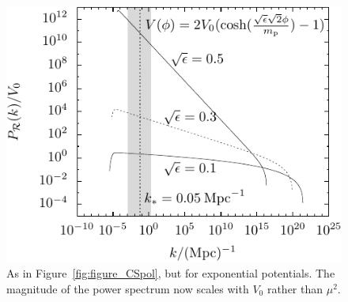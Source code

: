 %
\begin{figure}[ht]
  \includegraphics[width=\textwidth]{chapter_kinetic_dominance/figures/CSlam}
  \caption{As in Figure~\protect\ref{fig:figure_CSpol}, but for exponential potentials. The magnitude of the power spectrum now scales with $V_0$ rather than $\mu^2$.\label{fig:figure_CSlam}}
\end{figure}
%

